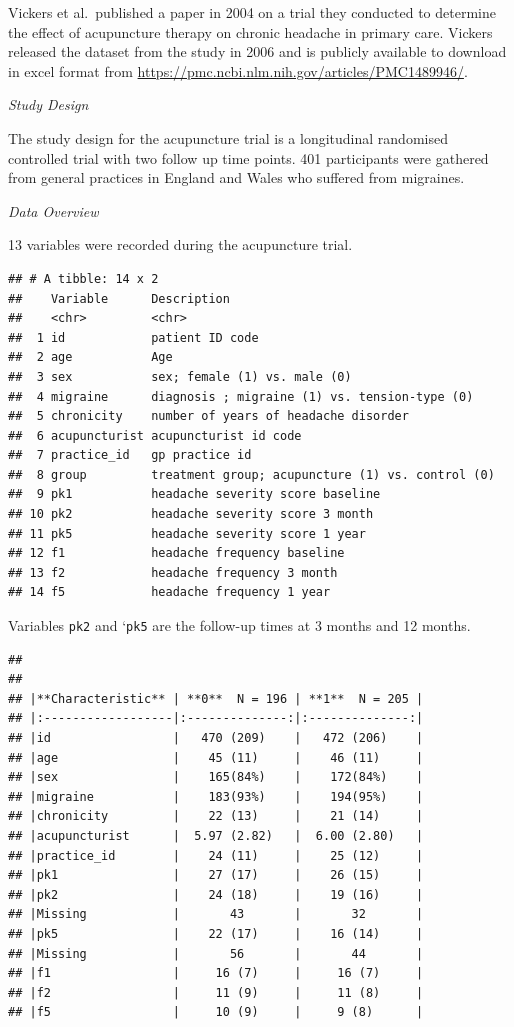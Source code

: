\documentclass{article}
\begin{document}
Vickers et al.~published a paper in 2004 on a trial they conducted to
determine the effect of acupuncture therapy on chronic headache in
primary care. Vickers released the dataset from the study in 2006 and is
publicly available to download in excel format from
\url{https://pmc.ncbi.nlm.nih.gov/articles/PMC1489946/}.

\emph{Study Design}

The study design for the acupuncture trial is a longitudinal randomised
controlled trial with two follow up time points. 401 participants were
gathered from general practices in England and Wales who suffered from
migraines.

\emph{Data Overview}

13 variables were recorded during the acupuncture trial.

\begin{verbatim}
## # A tibble: 14 x 2
##    Variable      Description                                     
##    <chr>         <chr>                                           
##  1 id            patient ID code                                 
##  2 age           Age                                             
##  3 sex           sex; female (1) vs. male (0)                    
##  4 migraine      diagnosis ; migraine (1) vs. tension-type (0)   
##  5 chronicity    number of years of headache disorder            
##  6 acupuncturist acupuncturist id code                           
##  7 practice_id   gp practice id                                  
##  8 group         treatment group; acupuncture (1) vs. control (0)
##  9 pk1           headache severity score baseline                
## 10 pk2           headache severity score 3 month                 
## 11 pk5           headache severity score 1 year                  
## 12 f1            headache frequency baseline                     
## 13 f2            headache frequency 3 month                      
## 14 f5            headache frequency 1 year
\end{verbatim}

Variables \texttt{pk2} and `\texttt{pk5} are the follow-up times at 3
months and 12 months.

\begin{verbatim}
## 
## 
## |**Characteristic** | **0**  N = 196 | **1**  N = 205 |
## |:------------------|:--------------:|:--------------:|
## |id                 |   470 (209)    |   472 (206)    |
## |age                |    45 (11)     |    46 (11)     |
## |sex                |    165(84%)    |    172(84%)    |
## |migraine           |    183(93%)    |    194(95%)    |
## |chronicity         |    22 (13)     |    21 (14)     |
## |acupuncturist      |  5.97 (2.82)   |  6.00 (2.80)   |
## |practice_id        |    24 (11)     |    25 (12)     |
## |pk1                |    27 (17)     |    26 (15)     |
## |pk2                |    24 (18)     |    19 (16)     |
## |Missing            |       43       |       32       |
## |pk5                |    22 (17)     |    16 (14)     |
## |Missing            |       56       |       44       |
## |f1                 |     16 (7)     |     16 (7)     |
## |f2                 |     11 (9)     |     11 (8)     |
## |f5                 |     10 (9)     |     9 (8)      |
\end{verbatim}
\end{document}
